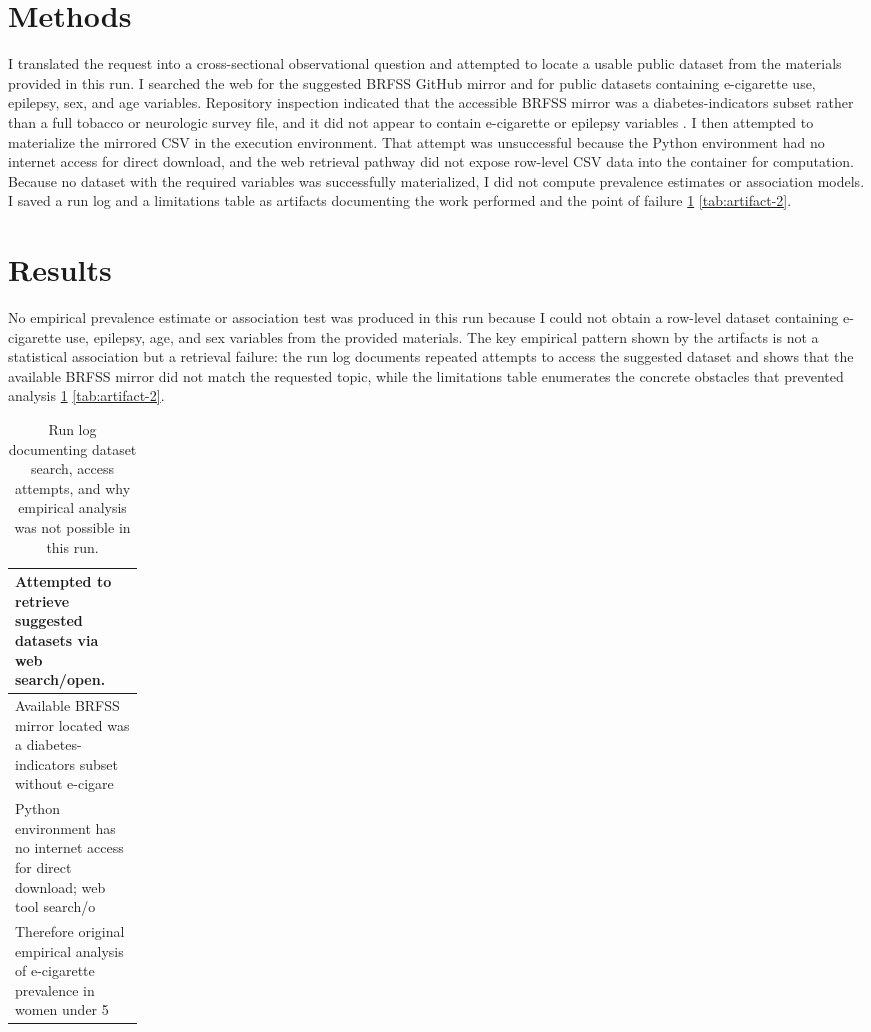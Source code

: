 \documentclass[11pt]{article}
\begin{document}
\section{Methods}
I translated the request into a cross-sectional observational question and attempted to locate a usable public dataset from the materials provided in this run. I searched the web for the suggested BRFSS GitHub mirror and for public datasets containing e-cigarette use, epilepsy, sex, and age variables. Repository inspection indicated that the accessible BRFSS mirror was a diabetes-indicators subset rather than a full tobacco or neurologic survey file, and it did not appear to contain e-cigarette or epilepsy variables \cite{ref1}. I then attempted to materialize the mirrored CSV in the execution environment. That attempt was unsuccessful because the Python environment had no internet access for direct download, and the web retrieval pathway did not expose row-level CSV data into the container for computation. Because no dataset with the required variables was successfully materialized, I did not compute prevalence estimates or association models. I saved a run log and a limitations table as artifacts documenting the work performed and the point of failure \ref{tab:artifact-1} \ref{tab:artifact-2}.

\section{Results}
No empirical prevalence estimate or association test was produced in this run because I could not obtain a row-level dataset containing e-cigarette use, epilepsy, age, and sex variables from the provided materials. The key empirical pattern shown by the artifacts is not a statistical association but a retrieval failure: the run log documents repeated attempts to access the suggested dataset and shows that the available BRFSS mirror did not match the requested topic, while the limitations table enumerates the concrete obstacles that prevented analysis \ref{tab:artifact-1} \ref{tab:artifact-2}.

\begin{table}[tbp]
\centering
\caption{Run log documenting dataset search, access attempts, and why empirical analysis was not possible in this run.}
\label{tab:artifact-1}
\begin{tabular}{>{\raggedright\arraybackslash}p{0.15\linewidth}}
\toprule
Attempted to retrieve suggested datasets via web search/open. \\
\midrule
Available BRFSS mirror located was a diabetes-indicators subset without e-cigare \\
Python environment has no internet access for direct download; web tool search/o \\
Therefore original empirical analysis of e-cigarette prevalence in women under 5 \\
\bottomrule
\end{tabular}
\end{table}
\end{document}
